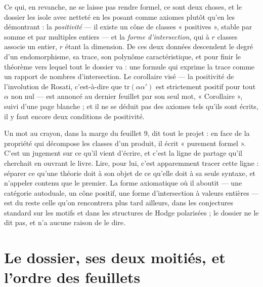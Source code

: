 \documentclass[11pt,a4paper]{article}
\begin{document}
\begin{resume}
Ce qui, en revanche, ne se laisse pas rendre formel, ce sont deux choses, et le
dossier les isole avec netteté en les posant comme axiomes plutôt qu'en les
démontrant : la \emph{positivité} — il existe un cône de classes « positives »,
stable par somme et par multiples entiers — et la \emph{forme d'intersection},
qui à $r$ classes associe un entier, $r$ étant la dimension. De ces deux
données descendent le degré d'un endomorphisme, sa trace, son polynôme
caractéristique, et pour finir le théorème vers lequel tout le dossier va :
une formule qui exprime la trace comme un rapport de nombres d'intersection.
Le corollaire visé — la positivité de l'involution de Rosati, c'est-à-dire que
$\mathrm{tr}(\alpha\alpha')$ est strictement positif pour tout $\alpha$ non
nul — est annoncé au dernier feuillet par son seul mot, « Corollaire », suivi
d'une page blanche ; et il ne se déduit pas des axiomes tels qu'ils sont
écrits, il y faut encore deux conditions de positivité.

Un mot au crayon, dans la marge du feuillet 9, dit tout le projet : en face de
la propriété qui décompose les classes d'un produit, il écrit « purement
formel ». C'est un jugement sur ce qu'il vient d'écrire, et c'est la ligne de
partage qu'il cherchait en ouvrant le livre. Lire, pour lui, c'est
apparemment tracer cette ligne : séparer ce qu'une théorie doit à son objet de
ce qu'elle doit à sa seule syntaxe, et n'appeler contenu que le premier. La
forme axiomatique où il aboutit — une catégorie autoduale, un cône positif, une
forme d'intersection à valeurs entières — est du reste celle qu'on rencontrera
plus tard ailleurs, dans les conjectures standard sur les motifs et dans les
structures de Hodge polarisées ; le dossier ne le dit pas, et n'a aucune raison
de le dire.

\end{resume}

\section*{Le dossier, ses deux moitiés, et l'ordre des feuillets}
\end{document}
